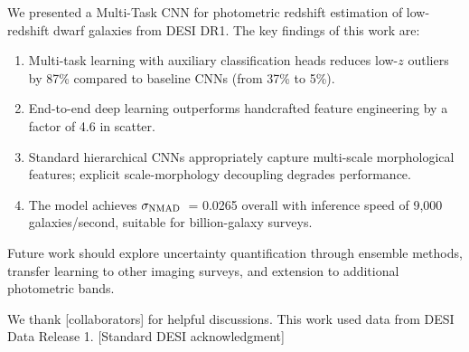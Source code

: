 \documentclass[linenumbers,twocolumn]{aastex7}
\newcommand{\sigmaNMAD}{\ensuremath{\sigma_{\rm NMAD}}}
\begin{document}
We presented a Multi-Task CNN for photometric redshift estimation of low-redshift 
dwarf galaxies from DESI DR1. The key findings of this work are:

\begin{enumerate}
    \item Multi-task learning with auxiliary classification heads reduces 
    low-$z$ outliers by 87\% compared to baseline CNNs (from 37\% to 5\%).
    
    \item End-to-end deep learning outperforms handcrafted feature engineering 
    by a factor of 4.6 in scatter.
    
    \item Standard hierarchical CNNs appropriately capture multi-scale 
    morphological features; explicit scale-morphology decoupling degrades 
    performance.
    
    \item The model achieves \sigmaNMAD\ = 0.0265 overall with inference speed 
    of 9,000 galaxies/second, suitable for billion-galaxy surveys.
\end{enumerate}

Future work should explore uncertainty quantification through ensemble methods, 
transfer learning to other imaging surveys, and extension to additional 
photometric bands.

\begin{acknowledgments}
We thank [collaborators] for helpful discussions. This work used data from 
DESI Data Release 1. [Standard DESI acknowledgment]
\end{acknowledgments}




\end{document}

